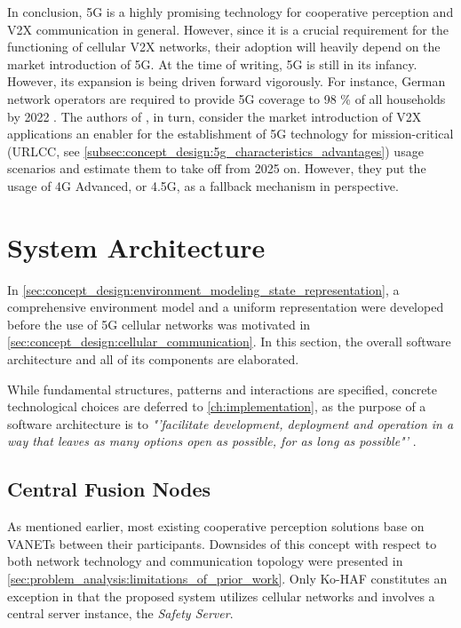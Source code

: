 In conclusion, 5G is a highly promising technology for cooperative perception and V2X communication in general. However, since it is a crucial requirement for the functioning of cellular V2X networks, their adoption will heavily depend on the market introduction of 5G. At the time of writing, 5G is still in its infancy. However, its expansion is being driven forward vigorously. For instance, German network operators are required to provide 5G coverage to 98 \% of all households by 2022 \cite{DeutscheWelle2019}. The authors of \cite{CCSInsight2018}, in turn, consider the market introduction of V2X applications an enabler for the establishment of 5G technology for mission-critical (URLCC, see \autoref{subsec:concept_design:5g_characteristics_advantages}) usage scenarios and estimate them to take off from 2025 on. However, they put the usage of 4G Advanced, or 4.5G, as a fallback mechanism in perspective.

\section{System Architecture}
\label{sec:concept_design:system_architecture}
In \autoref{sec:concept_design:environment_modeling_state_representation}, a comprehensive environment model and a uniform representation were developed before the use of 5G cellular networks was motivated in \autoref{sec:concept_design:cellular_communication}. In this section, the overall software architecture and all of its components are elaborated.

While fundamental structures, patterns and interactions are specified, concrete technological choices are deferred to \autoref{ch:implementation}, as the purpose of a software architecture is to \textit{"'facilitate development, deployment and operation in a way that leaves as many options open as possible, for as long as possible"'} \cite{Martin2017}.

\subsection{Central Fusion Nodes}
\label{subsec:concept_design:central_fusion_nodes}
As mentioned earlier, most existing cooperative perception solutions base on VANETs between their participants. Downsides of this concept with respect to both network technology and communication topology were presented in \autoref{sec:problem_analysis:limitations_of_prior_work}. Only Ko-HAF \cite{Hohm2019} constitutes an exception in that the proposed system utilizes cellular networks and involves a central server instance, the \textit{Safety Server}.

